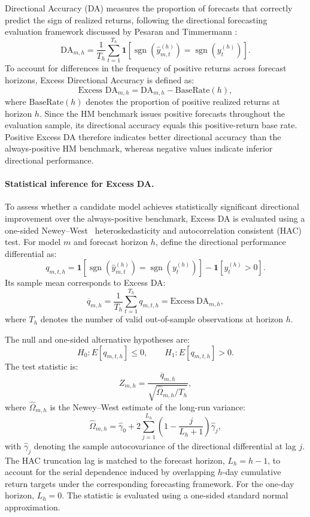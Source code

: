 \documentclass[runningheads,orivec]{llncs}
\begin{document}
Directional Accuracy (DA) measures the proportion of forecasts that correctly predict the sign of realized returns, following the directional forecasting evaluation framework discussed by Pesaran and Timmermann \cite{pesaran1992}:
\begin{equation}\label{eq:da}
\text{DA}_{m,h} = \frac{1}{T_h}\sum_{t=1}^{T_h} \mathbf{1}\left[\operatorname{sgn}(\hat{y}_{m,t}^{(h)}) = \operatorname{sgn}(y_t^{(h)})\right].
\end{equation}
To account for differences in the frequency of positive returns across forecast horizons, Excess Directional Accuracy is defined as:
\begin{equation}\label{eq:excess_da}
\text{Excess DA}_{m,h} = \text{DA}_{m,h} - \text{BaseRate}(h),
\end{equation}
where $\text{BaseRate}(h)$ denotes the proportion of positive realized returns at horizon $h$. Since the HM benchmark issues positive forecasts throughout the evaluation sample, its directional accuracy equals this positive-return base rate. Positive Excess DA therefore indicates better directional accuracy than the always-positive HM benchmark, whereas negative values indicate inferior directional performance.

\paragraph{Statistical inference for Excess DA.} To assess whether a candidate model achieves statistically significant directional improvement over the always-positive benchmark, Excess DA is evaluated using a one-sided Newey--West~\cite{newey1987} heteroskedasticity and autocorrelation consistent (HAC) test. For model $m$ and forecast horizon $h$, define the directional performance differential as:
\[
q_{m,t,h}
=
\mathbf{1}\left[
\operatorname{sgn}(\hat{y}_{m,t}^{(h)})
=
\operatorname{sgn}(y_t^{(h)})
\right]
-
\mathbf{1}\left[y_t^{(h)}>0\right].
\]
Its sample mean corresponds to Excess DA:
\[
\overline{q}_{m,h}
=
\frac{1}{T_h}\sum_{t=1}^{T_h}q_{m,t,h}
=
\mathrm{Excess\ DA}_{m,h},
\]
where $T_h$ denotes the number of valid out-of-sample observations at horizon $h$.

The null and one-sided alternative hypotheses are:
\[
H_0:E[q_{m,t,h}]\leq 0,
\qquad
H_1:E[q_{m,t,h}]>0.
\]
The test statistic is:
\[
Z_{m,h}
=
\frac{\overline{q}_{m,h}}
{\sqrt{\widehat{\Omega}_{m,h}/T_h}},
\]
where $\widehat{\Omega}_{m,h}$ is the Newey--West estimate of the long-run variance:
\[
\widehat{\Omega}_{m,h}
=
\widehat{\gamma}_0
+
2\sum_{j=1}^{L_h}
\left(1-\frac{j}{L_h+1}\right)
\widehat{\gamma}_j,
\]
with $\widehat{\gamma}_j$ denoting the sample autocovariance of the directional differential at lag $j$. The HAC truncation lag is matched to the forecast horizon, $L_h=h-1$, to account for the serial dependence induced by overlapping $h$-day cumulative return targets under the corresponding forecasting framework. For the one-day horizon, $L_h=0$. The statistic is evaluated using a one-sided standard normal approximation.
\end{document}
